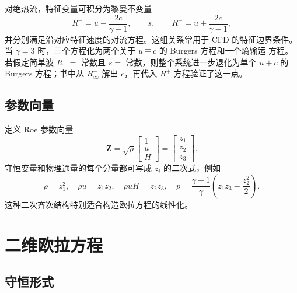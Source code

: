 \documentclass[11pt,a4paper,openany,fontset=none]{ctexbook}
\begin{document}
对绝热流，特征变量可积分为黎曼不变量
\begin{equation}
 R^- =u-\frac{2c}{\gamma-1},\qquad s,\qquad
 R^+=u+\frac{2c}{\gamma-1},
\end{equation}
并分别满足沿对应特征速度的对流方程。这组关系常用于 CFD 的特征边界条件。
当 $\gamma=3$ 时，三个方程化为两个关于 $u\mp c$ 的 Burgers 方程和一个熵输运
方程。若假定简单波 $R^-=$ 常数且 $s=$ 常数，则整个系统进一步退化为单个
$u+c$ 的 Burgers 方程；书中从 $R^-_\infty$ 解出 $c$，再代入 $R^+$ 方程验证了这一点。

\subsection{参数向量}

定义 Roe 参数向量
\begin{equation}
 \bm Z=\sqrt\rho\begin{bmatrix}1\\u\\H\end{bmatrix}
      =\begin{bmatrix}z_1\\z_2\\z_3\end{bmatrix}.
\end{equation}
守恒变量和物理通量的每个分量都可写成 $z_i$ 的二次式，例如
\begin{equation}
 \rho=z_1^2,\quad \rho u=z_1z_2,\quad \rho uH=z_2z_3,\quad
 p=\frac{\gamma-1}{\gamma}\left(z_1z_3-\frac{z_2^2}{2}\right).
\end{equation}
这种二次齐次结构特别适合构造欧拉方程的线性化。

\section{二维欧拉方程}

\subsection{守恒形式}
\end{document}
